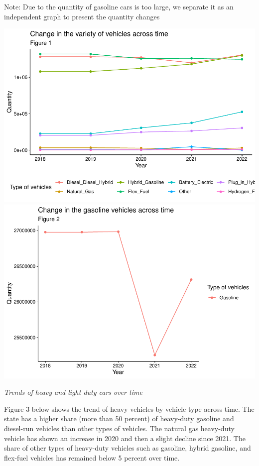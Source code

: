 \documentclass[
  12pt,
]{article}
\begin{document}
Note: Due to the quantity of gasoline cars is too large, we separate it
as an independent graph to present the quantity changes

\includegraphics{Code_Main-Markdown_files/figure-latex/unnamed-chunk-3-1.pdf}
\includegraphics{Code_Main-Markdown_files/figure-latex/unnamed-chunk-3-2.pdf}

\emph{Trends of heavy and light duty cars over time}

Figure 3 below shows the trend of heavy vehicles by vehicle type across
time. The state has a higher share (more than 50 percent) of heavy-duty
gasoline and diesel-run vehicles than other types of vehicles. The
natural gas heavy-duty vehicle has shown an increase in 2020 and then a
slight decline since 2021. The share of other types of heavy-duty
vehicles such as gasoline, hybrid gasoline, and flex-fuel vehicles has
remained below 5 percent over time.
\end{document}
